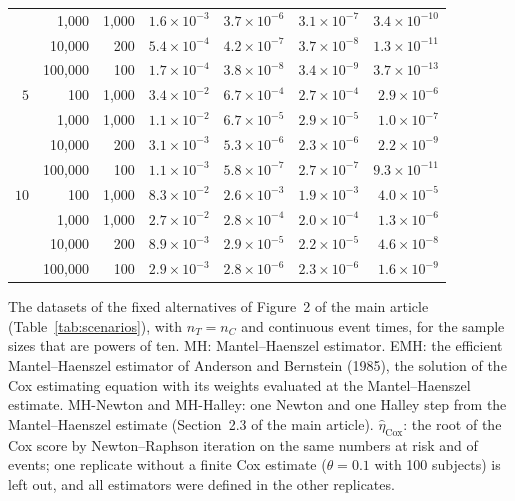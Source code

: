 \begin{table}
\begin{tabular}{rrrrrrr}
 & 1,000 & 1,000 & $1.6 \times 10^{-3}$ & $3.7 \times 10^{-6}$ & $3.1 \times 10^{-7}$ & $3.4 \times 10^{-10}$ \\
 & 10,000 & 200 & $5.4 \times 10^{-4}$ & $4.2 \times 10^{-7}$ & $3.7 \times 10^{-8}$ & $1.3 \times 10^{-11}$ \\
 & 100,000 & 100 & $1.7 \times 10^{-4}$ & $3.8 \times 10^{-8}$ & $3.4 \times 10^{-9}$ & $3.7 \times 10^{-13}$ \\
\midrule
$5$ & 100 & 1,000 & $3.4 \times 10^{-2}$ & $6.7 \times 10^{-4}$ & $2.7 \times 10^{-4}$ & $2.9 \times 10^{-6}$ \\
 & 1,000 & 1,000 & $1.1 \times 10^{-2}$ & $6.7 \times 10^{-5}$ & $2.9 \times 10^{-5}$ & $1.0 \times 10^{-7}$ \\
 & 10,000 & 200 & $3.1 \times 10^{-3}$ & $5.3 \times 10^{-6}$ & $2.3 \times 10^{-6}$ & $2.2 \times 10^{-9}$ \\
 & 100,000 & 100 & $1.1 \times 10^{-3}$ & $5.8 \times 10^{-7}$ & $2.7 \times 10^{-7}$ & $9.3 \times 10^{-11}$ \\
\midrule
$10$ & 100 & 1,000 & $8.3 \times 10^{-2}$ & $2.6 \times 10^{-3}$ & $1.9 \times 10^{-3}$ & $4.0 \times 10^{-5}$ \\
 & 1,000 & 1,000 & $2.7 \times 10^{-2}$ & $2.8 \times 10^{-4}$ & $2.0 \times 10^{-4}$ & $1.3 \times 10^{-6}$ \\
 & 10,000 & 200 & $8.9 \times 10^{-3}$ & $2.9 \times 10^{-5}$ & $2.2 \times 10^{-5}$ & $4.6 \times 10^{-8}$ \\
 & 100,000 & 100 & $2.9 \times 10^{-3}$ & $2.8 \times 10^{-6}$ & $2.3 \times 10^{-6}$ & $1.6 \times 10^{-9}$ \\
\bottomrule
\end{tabular}
\par\smallskip
{\footnotesize The datasets of the fixed alternatives of Figure~2 of the main article (Table~\ref{tab:scenarios}), with $n_T = n_C$ and continuous event times, for the sample sizes that are powers of ten. MH: Mantel--Haenszel estimator. EMH: the efficient Mantel--Haenszel estimator of Anderson and Bernstein (1985), the solution of the Cox estimating equation with its weights evaluated at the Mantel--Haenszel estimate. MH-Newton and MH-Halley: one Newton and one Halley step from the Mantel--Haenszel estimate (Section~2.3 of the main article). $\hat{\eta}_{\mathrm{Cox}}$: the root of the Cox score by Newton--Raphson iteration on the same numbers at risk and of events; one replicate without a finite Cox estimate ($\theta = 0.1$ with 100 subjects) is left out, and all estimators were defined in the other replicates.\par}
\end{table}
